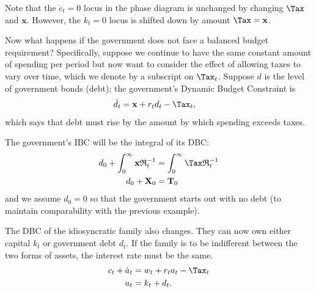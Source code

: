 \documentclass{handout}\usepackage{handoutSetup}\usepackage{handoutShortcuts}
\begin{document}
Note that the $\dot{c}_t=0$ locus in the phase diagram is unchanged by 
changing $\Tax$ and $\mathbf{x}$.  However, the $\dot{k}_{t}=0$ locus is 
shifted down by amount $\Tax = \mathbf{x}$.  

Now what happens if the government does not face a balanced budget
requirement?  Specifically, suppose we continue to have the same
constant amount of spending per period but now want to consider the
effect of allowing taxes to vary over time, which we denote by a
subscript on $\Tax_{t}$.  Suppose $d$ is the level of government bonds
(debt); the government's Dynamic Budget Constraint is
\begin{equation}\begin{gathered}\begin{aligned}
        \dot{d}_{t} & =  \mathbf{x}+r_{t} {d}_{t}-\Tax_{t},
\end{aligned}\end{gathered}\end{equation}
which says that debt must rise by the amount by which spending exceeds 
taxes.

The government's IBC will be the integral of its DBC:
\begin{equation}\begin{gathered}\begin{aligned}
        {d}_{0}+\int_{0}^{\infty}\mathbf{x} \mathfrak{R}^{-1}_{t}   & =  \int_{0}^{\infty} \Tax \mathfrak{R}_{t}^{-1}   \\
        {d}_{0}+\mathbf{X}_{0} & =  \mathbf{T}_{0}
\end{aligned}\end{gathered}\end{equation}
and we assume ${d}_{0}=0$ so that the government starts out with no debt 
(to maintain comparability with the previous example).

The DBC of the idiosyncratic family also changes.  They can now own 
either capital $k_{t}$ or government debt ${d}_{t}$.  If the family is to be 
indifferent between the two forms of assets, the interest rate must be 
the same.
\begin{equation}\begin{gathered}\begin{aligned}
        c_{t} + \dot{a}_{t} & =  w_{t} + r_{t} a_{t} - \Tax_{t} \\
        a_{t} & =  k_{t} + {d}_{t}.
\end{aligned}\end{gathered}\end{equation}
\end{document}
